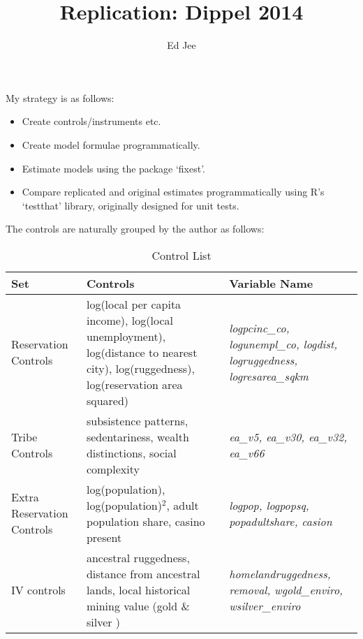\documentclass{article}
\author{Ed Jee}
\title{Replication: Dippel 2014}
\begin{document}
\maketitle

My strategy is as follows:

\begin{itemize}
    \item Create controls/instruments etc.
    \item Create model formulae programmatically.
    \item Estimate models using the package `fixest'.
    \item Compare replicated and original estimates programmatically using
    R's `testthat' library, originally designed for unit tests.  
\end{itemize}

The controls are naturally grouped by the author as follows:

\begin{table}[htbp]
    \centering\begin{tabular}{| m{4cm} | m{5cm} | m{5cm} | }
        \hline 
    Set & Controls  & Variable Name\\ \hline\hline
    Reservation Controls & log(local per capita  income),
    log(local unemployment),
    log(distance to nearest city),
    log(ruggedness),
    log(reservation area squared) &
    \textit{
        logpcinc\_co,
        logunempl\_co,
        logdist,
        logruggedness,
        logresarea\_sqkm
    }  \\  \hline
    Tribe Controls & subsistence patterns,
    sedentariness,
    wealth distinctions,
    social complexity &
    \textit{
        ea\_v5,
        ea\_v30,
        ea\_v32,
        ea\_v66
    }\\ \hline
    Extra Reservation Controls & log(population),
    log(population)$^2$,
    adult population share,
    casino present &
    \textit{
        logpop,
        logpopsq,
        popadultshare,
        casion
    }\\ \hline
    IV controls & ancestral ruggedness,
    distance from ancestral lands,
    local historical mining value (gold \& silver  ) 
    & \textit{
        homelandruggedness,
        removal,
        wgold\_enviro,
        wsilver\_enviro
    }\\ 
    \hline
    
    \end{tabular}
    \caption{Control List}
    \label{controls}
\end{table}
\end{document}

